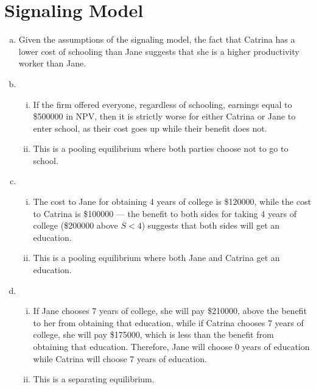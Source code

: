 \documentclass[8pt]{extarticle}
\begin{document}
  \section{Signaling Model}%
  \begin{description}[font=\normalfont]
    \item[(3)]\hfill
      \begin{enumerate}[(a)]
        \item Given the assumptions of the signaling model, the fact that Catrina has a lower cost of schooling than Jane suggests that she is a higher productivity worker than Jane.
        \item 
          \begin{enumerate}[(i)]
            \item If the firm offered everyone, regardless of schooling, earnings equal to \$500000 in NPV, then it is strictly worse for either Catrina or Jane to enter school, as their cost goes up while their benefit does not.
            \item This is a pooling equilibrium where both parties choose not to go to school.
          \end{enumerate}
        \item 
          \begin{enumerate}[(i)]
            \item The cost to Jane for obtaining 4 years of college is \$120000, while the cost to Catrina is \$100000 --- the benefit to both sides for taking 4 years of college (\$200000 above $S<4$) suggests that both sides will get an education.
            \item This is a pooling equilibrium where both Jane and Catrina get an education.
          \end{enumerate}
        \item 
          \begin{enumerate}[(i)]
            \item If Jane chooses 7 years of college, she will pay \$210000, above the benefit to her from obtaining that education, while if Catrina chooses 7 years of college, she will pay \$175000, which is less than the benefit from obtaining that education. Therefore, Jane will choose 0 years of education while Catrina will choose 7 years of education.
            \item This is a separating equilibrium.
          \end{enumerate}
      \end{enumerate}
  \end{description}
\end{document}
